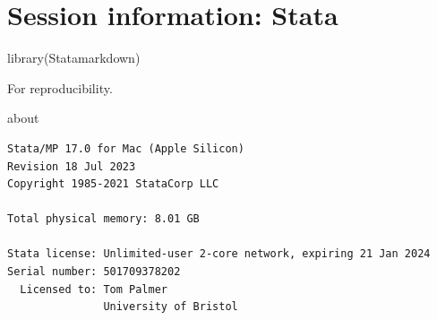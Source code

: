 \documentclass[
  10pt,
  a4paper,
]{book}
\newenvironment{Shaded}{\begin{snugshade}}{\end{snugshade}}
\newcommand{\FunctionTok}[1]{\textcolor[rgb]{0.28,0.35,0.67}{#1}}
\newcommand{\NormalTok}[1]{\textcolor[rgb]{0.00,0.46,0.62}{#1}}
\begin{document}
\hypertarget{session-information-stata}{%
\chapter*{Session information: Stata}\label{session-information-stata}}

\begin{Shaded}
\begin{Highlighting}[]
\FunctionTok{library}\NormalTok{(Statamarkdown)}
\end{Highlighting}
\end{Shaded}

For reproducibility.

\begin{Shaded}
\begin{Highlighting}[]
\NormalTok{about}
\end{Highlighting}
\end{Shaded}

\begin{verbatim}
Stata/MP 17.0 for Mac (Apple Silicon)
Revision 18 Jul 2023
Copyright 1985-2021 StataCorp LLC

Total physical memory: 8.01 GB

Stata license: Unlimited-user 2-core network, expiring 21 Jan 2024
Serial number: 501709378202
  Licensed to: Tom Palmer
               University of Bristol
\end{verbatim}
\end{document}

